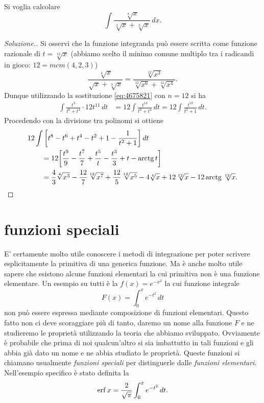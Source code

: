 \begin{example}
Si voglia calcolare
\[
  \int \frac{\sqrt[4]{x}}{\sqrt[2]{x} + \sqrt[3]{x}}\, dx.
\]
\end{example}
\begin{proof}[Soluzione.]
Si osservi che la funzione integranda può essere scritta
come funzione razionale di $t=\sqrt[12]{x}$ (abbiamo scelto
il minimo comune multiplo tra i radicandi in gioco: $12 = mcm(4,2,3)$)
\[
  \frac{\sqrt[4]{x}}{\sqrt{x} + \sqrt[3]{x}}
  = \frac{\sqrt[12]{x^3}}{\sqrt[12]{x^6} + \sqrt[12]{x^4}}.
\]
Dunque utilizzando la sostituzione \eqref{eq:4675821} con $n=12$ si ha
\begin{align*}
\int \frac{t^3}{t^6 + t^4}\cdot 12 t^{11}\, dt
&= 12 \int \frac{t^{14}}{t^6+t^4}\, dt
 = 12 \int \frac{t^{10}}{t^2+1}\, dt.
\end{align*}
Procedendo con la divisione tra polinomi si ottiene
\begin{align*}
\MoveEqLeft{12 \int \Enclose{t^8 - t^6 + t^4 - t^2 + 1 - \frac{1}{t^2+1}}\, dt} \\
&= 12 \Enclose{\frac{t^9}{9} - \frac{t^7}{7} + \frac{t^5}{t} - \frac{t^3}{3} + t - \arctg t} \\
&= \frac 4 3 \sqrt[4]{x^3} - \frac{12}{7}\sqrt[12]{x^7}
+ \frac{12}{5}\sqrt[12]{x^5} - 4 \sqrt[4]{x} + 12 \sqrt[12]{x} - 12 \arctg \sqrt[12]{x}.
\end{align*}
\end{proof}

\section{funzioni speciali}

E' certamente molto utile conoscere i metodi di integrazione 
per poter scrivere esplicitamente la primitiva di una 
generica funzione. 
Ma è anche molto utile sapere che esistono alcune funzioni 
elementari la cui primitiva non è una funzione elementare.
Un esempio su tutti è la 
%
%
$f(x) = e^{-x^2}$ la cui funzione integrale 
\[
 F(x) = \int_0^x e^{-t^2}\, dt
\]
non può essere espressa mediante composizione di funzioni 
elementari.
Questo fatto non ci deve scoraggiare più di tanto,
daremo un nome alla funzione $F$ e ne studieremo le proprietà 
utilizzando la teoria che abbiamo sviluppato.
Ovviamente è probabile che prima di noi qualcun'altro 
si sia imbattutto in tali funzioni e gli abbia già dato 
un nome e ne abbia studiato le proprietà. 
Queste funzioni si chiamano usualmente \emph{funzioni speciali}
per distinguerle dalle \emph{funzioni elementari}.
%
%
%
%
Nell'esempio specifico è stato definita la 
\[
  \operatorname{erf} x = \frac{2}{\sqrt \pi} \int_0^x e^{-t^2}\, dt.
\]

